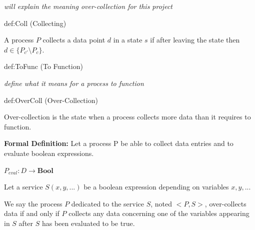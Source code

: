 
\textit{will explain the meaning over-collection for this project}

\begin{definition}{def:Coll}{}
(Collecting)

A process $P$ collects a data point $d$ in a state $s$ if after leaving the state then $d \in \{P_{c'} \setminus P_{c}\}$.

\end{definition}

\begin{definition}{def:ToFunc}{}
(To Function)

\textit{define what it means for a process to function}
\end{definition}


\begin{definition}{def:OverColl}{} 
(Over-Collection)

Over-collection is the state when a process collects more data than it requires to function. 
\end{definition} 

\textbf{Formal Definition: } 
Let a process P be able to collect data entries and to evaluate boolean expressions. 



$P_{eval}: D \rightarrow \textbf{Bool}$

Let a service $S(x, y, ...)$ be a boolean expression depending on variables $x, y, ...$ 

We say the process $P$ dedicated to the service $S$, noted $<P,S>$, over-collects data if and only if $P$ collects any data concerning one of the variables appearing in $S$ after $S$ has been evaluated to be true.

